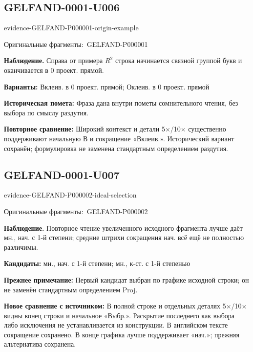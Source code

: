 \documentclass[11pt]{article}
\newcommand{\EvidenceBlock}[4]{%
 \par\smallskip\noindent\begin{minipage}{\linewidth}
 \begin{minipage}[t]{.47\linewidth}\vspace{0pt}\centering
 \csname evidence-#1-#2\endcsname\par
 {\scriptsize\SourceCropCaption\ #1}\par
 \end{minipage}\hfill
 \begin{minipage}[t]{.49\linewidth}\vspace{0pt}\raggedright
 {\small\color{orange!65!black}\textbf{#4} #3}\par
 \end{minipage}
 \end{minipage}\par\smallskip}
\newcommand{\SourceCropCaption}{Оригинальные фрагменты:}\newcommand{\ReadingCaption}{Сомнительное чтение.}\newcommand{\IncompleteCaption}{Неразобранный фрагмент.}\newcommand{\DiagramCaption}{Рисунок и набранное описание.}
\begin{document}
\subsection*{GELFAND-0001-U006}
\EvidenceBlock{GELFAND-P000001}{origin-example}{Справа от примера \(R^2\) строка начинается связной группой букв и оканчивается в 0 проект. прямой.}{Наблюдение.}
\par\smallskip\noindent\textbf{Варианты: } Вклеив. в 0 проект. прямой; Оклеив. в 0 проект. прямой\par
\par\smallskip\noindent\textbf{Историческая помета: } Фраза дана внутри пометы сомнительного чтения, без выбора по смыслу раздутия.\par
\par\smallskip\noindent\textbf{Повторное сравнение: } Широкий контекст и детали 5×/10× существенно поддерживают начальную В и сокращение «Вклеив.». Исторический вариант сохранён; формулировка не заменена стандартным определением раздутия.\par

\subsection*{GELFAND-0001-U007}
\EvidenceBlock{GELFAND-P000002}{ideal-selection}{Повторное чтение увеличенного исходного фрагмента лучше даёт мн., нач. с 1-й степени; средние штрихи сокращения нач. всё ещё не полностью различимы.}{Наблюдение.}
\par\smallskip\noindent\textbf{Кандидаты: } мн., нач. с 1-й степени; мн., к-ст. с 1-й степенью\par
\par\smallskip\noindent\textbf{Прежнее примечание: } Первый кандидат выбран по графике исходной строки; он не заменён стандартным определением Proj.\par
\par\smallskip\noindent\textbf{Новое сравнение с источником: } В полной строке и отдельных деталях 5×/10× видны конец строки и начальное «Выбр.». Раскрытие последнего как выбора либо исключения не устанавливается из конструкции. В английском тексте сокращение сохранено. В конце графика лучше поддерживает «нач.»; прежняя альтернатива сохранена.\par
\end{document}
